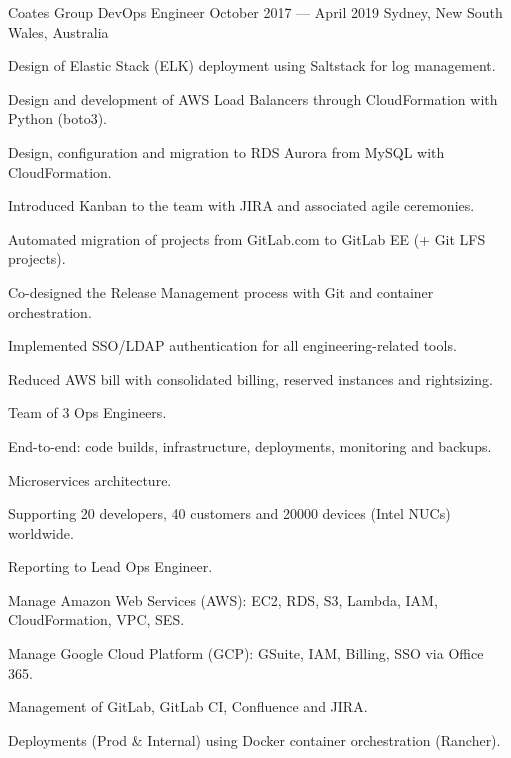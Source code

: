 \begin{cventries}
  \cventry
  {Coates Group} %
  {DevOps Engineer} %
  {October 2017 --- April 2019} %
  {Sydney, New South Wales, Australia} %
  {
    \begin{cvitems}
      \item {Design of Elastic Stack (ELK) deployment using Saltstack for log management.}
      \item {Design and development of AWS Load Balancers through CloudFormation with Python (boto3).}
      \item {Design, configuration and migration to RDS Aurora from MySQL with CloudFormation.}
      \item {Introduced Kanban to the team with JIRA and associated agile ceremonies.}
      \item {Automated migration of projects from GitLab.com to GitLab EE (+ Git LFS projects).}
      \item {Co-designed the Release Management process with Git and container orchestration.}
      \item {Implemented SSO/LDAP authentication for all engineering-related tools.}
      \item {Reduced AWS bill with consolidated billing, reserved instances and rightsizing.}
    \end{cvitems}
  }
  {
    \begin{cvitems}
      \item {Team of 3 Ops Engineers.}
      \item {End-to-end: code builds, infrastructure, deployments, monitoring and backups.}
      \item {Microservices architecture.}
      \item {Supporting 20 developers, 40 customers and 20000 devices (Intel NUCs) worldwide.}
      \item {Reporting to Lead Ops Engineer.}
    \end{cvitems}
  }
  {
    \begin{cvitems}
      \item {Manage Amazon Web Services (AWS): EC2, RDS, S3, Lambda, IAM, CloudFormation, VPC, SES.}
      \item {Manage Google Cloud Platform (GCP): GSuite, IAM, Billing, SSO via Office 365.}
      \item {Management of GitLab, GitLab CI, Confluence and JIRA.}
      \item {Deployments (Prod \& Internal) using Docker container orchestration (Rancher).}

\end{cvitems}}
\end{cventries}
